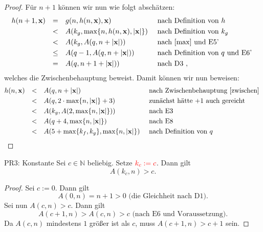 \documentclass[a4paper]{amsart}
\theoremstyle{definition}
\newcommand{\N}{\ensuremath{\mathbb{ N }}}
\newcommand{\bb}[1]{\mathbf{#1}}
\begin{document}
\begin{proof}
    Für $n+1$ können wir nun wie folgt abschätzen:
    \begin{align*}
        &h(n+1,\bb{x}) & =   &&& g( n, h( n, \bb{x} ), \bb{x} )                 &&\text{ nach Definition von } h\\
        &              & <   &&& A( k_g, \max \{ n, h( n,\bb{x} ), |\bb{x}|\} ) &&\text{ nach Definition von } k_g\\
        &              & <   &&& A( k_g, A(q, n + |\bb{x}|) )                   &&\text{ nach \eqref{max} und E5' } \\
        &              & \le &&& A( q-1, A(q, n + |\bb{x}|) )                   &&\text{ nach Definition von $q$ und E6' }\\
        &              & =   &&& A( q, n + 1 + |\bb{x}|) )                      &&\text{ nach D3 },
    \end{align*}
    welches die Zwischenbehauptung beweist. Damit können wir nun beweisen:    
    \begin{align*}
        &h(n,\bb{x})   & <   &&& A( q, n+ |\bb{x}| )                                 &&\text{ nach Zwischenbehauptung \eqref{zwischen} }\\
        &              & <   &&& A( q, 2 \cdot \max \{ n, |\bb{x}|\} + 3 )           &&\text{ zunächst hätte +1 auch gereicht}\\
        &              & <   &&& A( k_g, A(2, \max \{ n, |\bb{x}|\} ))               &&\text{ nach E3 } \\
        &              & <   &&& A( q+4, \max \{ n, |\bb{x}|\} )                     &&\text{ nach E8 }\\
        &              & <   &&& A( 5 + \max \{ k_f, k_g \}, \max \{ n, |\bb{x}|\} ) &&\text{ nach Definition von } q
    \end{align*}
 
\end{proof}

\begin{Theorem}{PR3: Konstante}
    Sei $c \in \N$ beliebig. Setze $\color{red}{k_c := c}$. Dann gilt
    \begin{equation*}
        A( k_c, n ) > c.
    \end{equation*}
\end{Theorem}
\begin{proof}
    Sei $c :=0$. Dann gilt
    \begin{equation*}
        A( 0, n ) = n+1 > 0 \text{ (die Gleichheit nach D1)}.
    \end{equation*}
    Sei nun $A( c, n ) > c$. Dann gilt
    \begin{equation*}
        A( c+1, n ) > A( c, n ) > c\text{ (nach E6 und Voraussetzung)}.
    \end{equation*}
    Da $A( c, n )$ mindestens $1$ größer ist als $c$, muss $A( c+1, n ) > c+1$ sein.
\end{proof}
\end{document}
